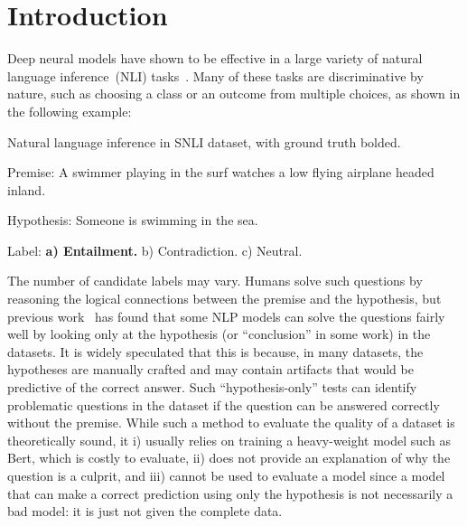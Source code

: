\section{Introduction}
\label{sec:intro}
Deep neural models have shown to be effective in 
a large variety of natural language inference~(NLI)
tasks~\cite{bowman2015large,wang2018glue,mostafazadeh2016corpus,roemmele2011choice,zellers2018swag}. Many of these tasks
are discriminative by nature, such as choosing a class 
or an outcome from multiple choices, as shown in the following example:

\begin{example}\label{exp:snli}
Natural language inference in SNLI dataset, with ground truth bolded.
\begin{description}
\item{Premise:} A swimmer playing in the surf watches a low flying airplane headed inland. 
\item{Hypothesis:} Someone is swimming in the sea.
\item{Label:} \textbf{a) Entailment.} b) Contradiction.  c) Neutral.
\end{description}
\end{example}

The number of candidate labels may vary. Humans solve such questions by
reasoning the logical connections between the premise and the hypothesis,
but previous work~\cite{naik2018stress,schuster2019towards} 
has found that some NLP models can solve the questions
fairly well by looking only at the hypothesis (or ``conclusion'' in some work)
in the datasets.
It is widely speculated that this is because, in many datasets, 
the hypotheses are manually crafted and may contain artifacts that
would be predictive of the correct answer. 
Such ``hypothesis-only'' tests can identify problematic questions
in the dataset if the question can be answered correctly without 
the premise. While such a method to evaluate the quality of
a dataset is theoretically sound, 
it i) usually relies on training a heavy-weight model such as Bert, which
is costly to evaluate, ii) does not provide an explanation of why the question is 
a culprit, and iii) cannot be used to evaluate a model since a model that
can make a correct prediction using only the hypothesis is not necessarily a
bad model: it is just not given the complete data.  



